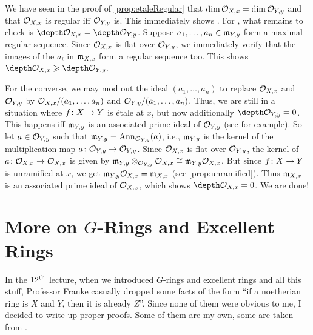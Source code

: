 \begin{proof*}
	We have seen in the proof of \cref{prop:etaleRegular} that $\dim \mathcal{O}_{X,x}=\dim\mathcal{O}_{Y,y}$ and that $\mathcal{O}_{X,x}$ is regular iff $\mathcal{O}_{Y,y}$ is. This immediately shows . For , what remains to check is $\depth \Oo_{X,x}=\depth\Oo_{Y,y}$. Suppose $a_1,\dotsc,a_n\in\mathfrak{m}_{Y,y}$ form a maximal regular sequence. Since $\mathcal{O}_{X,x}$ is flat over $\mathcal{O}_{Y,y}$, we immediately verify that the images of the $a_i$ in $\mathfrak{m}_{X,x}$ form a regular sequence too. This shows $\depth\Oo_{X,x}\geq \depth\Oo_{Y,y}$.
	
	For the converse, we may mod out the ideal $(a_1,\dotsc,a_n)$ to replace $\mathcal{O}_{X,x}$ and $\mathcal{O}_{Y,y}$ by $\mathcal{O}_{X,x}/(a_1,\dotsc,a_n)$ and $\mathcal{O}_{Y,y}/(a_1,\dotsc,a_n)$. Thus, we are still in a situation where $f\colon X\morphism Y$ is étale at $x$, but now additionally $\depth \Oo_{Y,y}=0$. This happens iff $\mathfrak{m}_{Y,y}$ is an associated prime ideal of $\mathcal{O}_{Y,y}$ (see \cite[Lemma~2.3.1]{homalg} for example). So let $a\in\mathcal{O}_{Y,y}$ such that $\mathfrak{m}_{Y,y}=\operatorname{Ann}_{\mathcal{O}_{Y,y}}(a)$, i.e., $\mathfrak{m}_{Y,y}$ is the kernel of the multiplication map $a\colon \Oo_{Y,y}\morphism\Oo_{Y,y}$. Since $\mathcal{O}_{X,x}$ is flat over $\mathcal{O}_{Y,y}$, the kernel of $a\colon \Oo_{X,x}\morphism\Oo_{X,x}$ is given by $\mathfrak{m}_{Y,y}\otimes_{\mathcal{O}_{Y,y}}\mathcal{O}_{X,x}\cong \mathfrak{m}_{Y,y}\mathcal{O}_{X,x}$. But since $f\colon X\morphism Y$ is unramified at $x$, we get $\mathfrak{m}_{Y,y}\mathcal{O}_{X,x}=\mathfrak{m}_{X,x}$ (see \cref{prop:unramified}). Thus $\mathfrak{m}_{X,x}$ is an associated prime ideal of $\mathcal{O}_{X,x}$, which shows $\depth \Oo_{X,x}=0$. We are done!
\end{proof*}
\section{More on \texorpdfstring{$G$}{G}-Rings and Excellent Rings}
In the $12^{\text{th}}$ lecture, when we introduced $G$-rings and excellent rings and all this stuff, Professor Franke casually dropped some facts of the form \enquote{if a noetherian ring is $X$ and $Y$, then it is already $Z$}. Since none of them were obvious to me, I decided to write up proper proofs. Some of them are my own, some are taken from \cite{stacks-project}.

